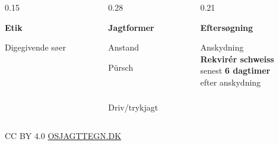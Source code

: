 \begin{frame}[plain]
\begin{columns}[T,onlytextwidth]
\begin{column}{0.15\textwidth}
\begin{tcolorbox}[gruppe, equal height group=bundraekke]
{\bfseries\color{myteal} Etik}\\[0.6mm]
\begin{tcolorbox}[feltfri]
Digegivende søer\\[0.4mm]
\\[0.2mm]
\end{tcolorbox}
\end{tcolorbox}
\end{column}

\begin{column}{0.28\textwidth}
\begin{tcolorbox}[gruppe, equal height group=bundraekke]
{\bfseries\color{myteal} Jagtformer}\\[0.6mm]
\begin{minipage}[t]{0.48\linewidth}
\begin{tcolorbox}[felt] Anstand\\[0.4mm]
\end{tcolorbox}
\end{minipage}\hfill
\begin{minipage}[t]{0.48\linewidth}
\begin{tcolorbox}[felt] Pürsch\\[0.4mm]
\end{tcolorbox}
\end{minipage}\\[0.8mm]
\begin{minipage}[t]{0.48\linewidth}
\begin{tcolorbox}[felt] Driv/trykjagt\\[0.4mm]
\end{tcolorbox}
\end{minipage}
\end{tcolorbox}
\end{column}

\begin{column}{0.21\textwidth}
\begin{tcolorbox}[gruppe, equal height group=bundraekke]
{\bfseries\color{myteal} Eftersøgning}\\[0.6mm]
\begin{tcolorbox}[feltfri]
Anskydning\\
\textbf{Rekvirér schweiss}\\
senest \textbf{6 dagtimer}\\
efter anskydning
\end{tcolorbox}
\end{tcolorbox}
\end{column}
\end{columns}

\vspace{1mm}
\hfill{\tiny\color{gray} CC BY 4.0 \href{https://osjagttegn.dk}{OSJAGTTEGN.DK}}
\end{frame}